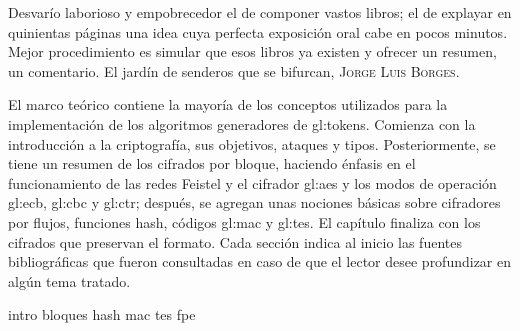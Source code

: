 %
%

{
  \epigrafe
  {%
    Desvarío laborioso y empobrecedor el de componer vastos libros; el de
    explayar en quinientas páginas una idea cuya perfecta exposición oral cabe
    en pocos minutos. Mejor procedimiento es simular que esos libros ya existen
    y ofrecer un resumen, un comentario.%
  }
  {%
    El jardín de senderos que se bifurcan,
    \textsc{Jorge Luis Borges}.%
  }
}

\noindent
El marco teórico contiene la mayoría de los conceptos utilizados para la
implementación de los algoritmos generadores de \glspl{gl:token}. Comienza con
la introducción a la criptografía, sus objetivos, ataques y tipos.
Posteriormente, se tiene un resumen de los cifrados por bloque, haciendo énfasis
en el funcionamiento de las redes Feistel y el cifrador \gls{gl:aes} y los modos
de operación \gls{gl:ecb}, \gls{gl:cbc} y \gls{gl:ctr}; después, se agregan unas
nociones básicas sobre cifradores por flujos, funciones hash, códigos
\gls{gl:mac} y \gls{gl:tes}. El capítulo finaliza con los cifrados que preservan
el formato. Cada sección indica al inicio las fuentes bibliográficas que fueron
consultadas en caso de que el lector desee profundizar en algún tema tratado.

{intro}
{bloques}
{hash}
{mac}
{tes}
{fpe}
